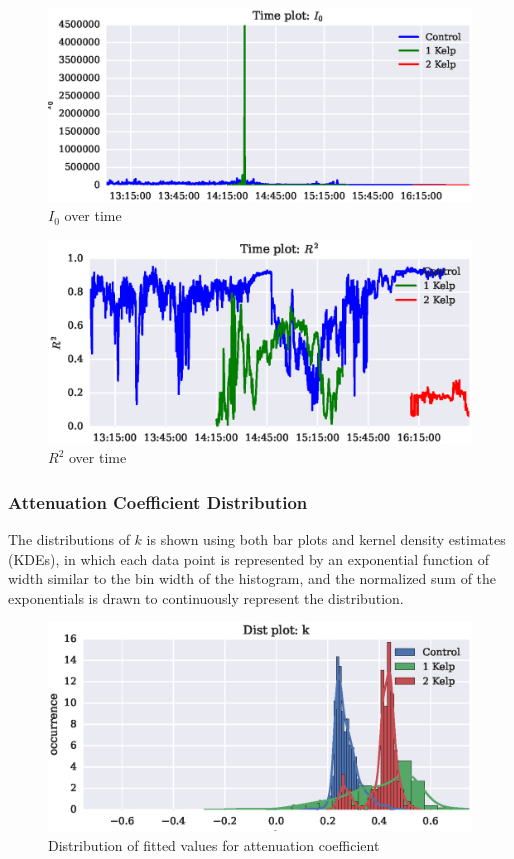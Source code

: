 \documentclass{article}
\newcommand\plotwidth{7in}
\begin{document}
\begin{figure}[H]
	\centering
	\includegraphics[width=\plotwidth]{time_I0.eps}
	\caption{$I_0$ over time}
	\label{time_I0}
\end{figure}

\begin{figure}[H]
	\centering
	\includegraphics[width=\plotwidth]{time_r_squared.eps}
	\caption{$R^2$ over time}
	\label{time_r_squared}
\end{figure}

\subsubsection{Attenuation Coefficient Distribution}
The distributions of $k$ is shown using both bar plots and kernel density estimates (KDEs), in which each data point is represented by an exponential function of width similar to the bin width of the histogram, and the normalized sum of the exponentials is drawn to continuously represent the distribution.

\begin{figure}[H]
	\centering
	\includegraphics[width=\plotwidth]{dist_k.eps}
	\caption{Distribution of fitted values for attenuation coefficient}
\end{figure}
\end{document}
